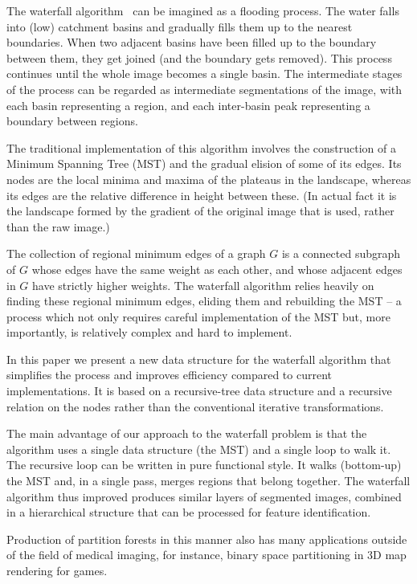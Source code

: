\documentclass[12pt]{ouclprgsc}
\begin{document}
The waterfall algorithm~\cite{beucher,marcotegui} can be imagined as a
flooding process. The water falls into (low) catchment basins and
gradually fills them up to the nearest boundaries. When two adjacent
basins have been filled up to the boundary between them, they get
joined (and the boundary gets removed). This process continues until
the whole image becomes a single basin. The intermediate stages of the
process can be regarded as intermediate segmentations of the image,
with each basin representing a region, and each inter-basin peak
representing a boundary between regions.

The traditional implementation of this algorithm \cite{marcotegui}
involves the construction of a Minimum Spanning Tree (MST) and the
gradual elision of some of its edges. Its nodes are the local minima
and maxima of the plateaus in the landscape, whereas its edges are the
relative difference in height between these. (In actual fact it is the
landscape formed by the gradient of the original image that is used,
rather than the raw image.)

The collection of regional minimum edges of a graph $G$ is a connected
subgraph of $G$ whose edges have the same weight as each other, and
whose adjacent edges in $G$ have strictly higher weights. The
waterfall algorithm relies heavily on finding these regional minimum
edges, eliding them and rebuilding the MST -- a process which not only
requires careful implementation of the MST but, more importantly, is
relatively complex and hard to implement.

In this paper we present a new data structure for the waterfall
algorithm that simplifies the process and improves efficiency compared
to current implementations. It is based on a recursive-tree data
structure and a recursive relation on the nodes rather than the
conventional iterative transformations.

The main advantage of our approach to the waterfall problem is that
the algorithm uses a single data structure (the MST) and a single loop
to walk it. The recursive loop can be written in pure functional
style. It walks (bottom-up) the MST and, in a single pass, merges
regions that belong together.
The waterfall algorithm thus improved produces similar layers of
segmented images, combined in a hierarchical structure that can be
processed for feature identification.

Production of partition forests in this manner also has many
applications outside of the field of medical imaging, for instance,
binary space partitioning in 3D map rendering for games.
\end{document}
